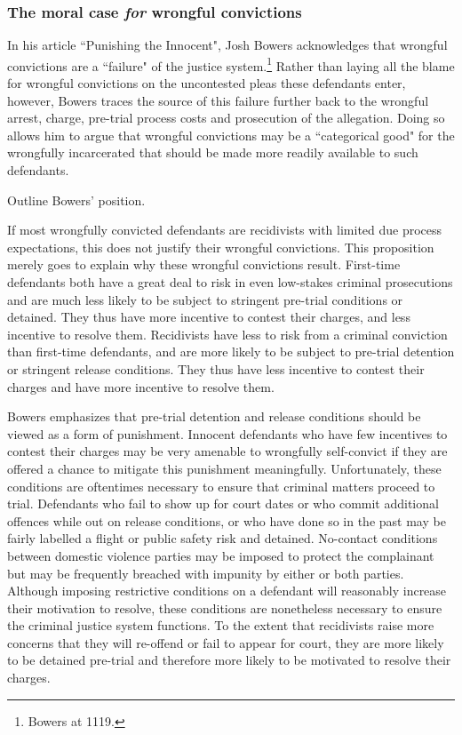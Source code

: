 \subsubsection{The moral case \textit{for} wrongful convictions}

In his article ``Punishing the Innocent", Josh Bowers acknowledges that wrongful convictions are a ``failure" of the justice system.\footnote{Bowers at 1119.} Rather than laying all the blame for wrongful convictions on the uncontested pleas these defendants enter, however, Bowers traces the source of this failure further back to the wrongful arrest, charge, pre-trial process costs and prosecution of the allegation. Doing so allows him to argue that wrongful convictions may be a ``categorical good" for the wrongfully incarcerated that should be made more readily available to such defendants.

Outline Bowers' position.

If most wrongfully convicted defendants are recidivists with limited due process expectations, this does not justify their wrongful convictions. This proposition merely goes to explain why these wrongful convictions result. First-time defendants both have a great deal to risk in even low-stakes criminal prosecutions and are much less likely to be subject to stringent pre-trial conditions or detained. They thus have more incentive to contest their charges, and less incentive to resolve them. Recidivists have less to risk from a criminal conviction than first-time defendants, and are more likely to be subject to pre-trial detention or stringent release conditions. They thus have less incentive to contest their charges and have more incentive to resolve them.

Bowers emphasizes that pre-trial detention and release conditions should be viewed as a form of punishment. Innocent defendants who have few incentives to contest their charges may be very amenable to wrongfully self-convict if they are offered a chance to mitigate this punishment meaningfully. Unfortunately, these conditions are oftentimes necessary to ensure that criminal matters proceed to trial. Defendants who fail to show up for court dates or who commit additional offences while out on release conditions, or who have done so in the past may be fairly labelled a flight or public safety risk and detained. No-contact conditions between domestic violence parties may be imposed to protect the complainant but may be frequently breached with impunity by either or both parties. Although imposing restrictive conditions on a defendant will reasonably increase their motivation to resolve, these conditions are nonetheless necessary to ensure the criminal justice system functions. To the extent that recidivists raise more concerns that they will re-offend or fail to appear for court, they are more likely to be detained pre-trial and therefore more likely to be motivated to resolve their charges. 


